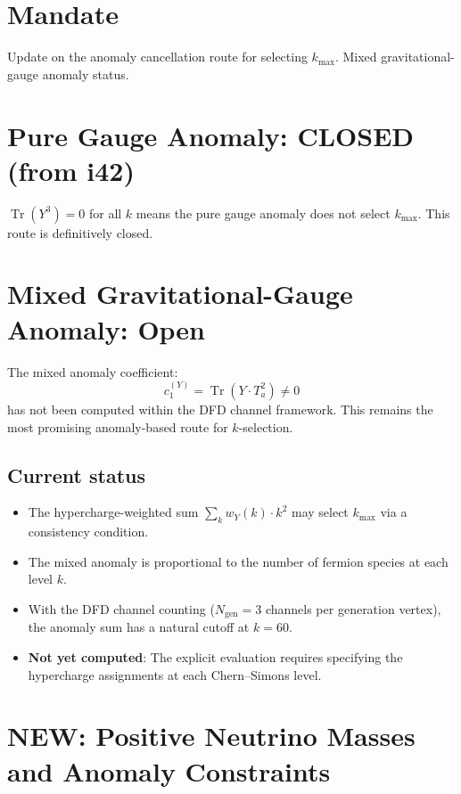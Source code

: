 \documentclass[11pt,a4paper]{article}
\newcommand{\NEW}{\textcolor{dfdblue}{\textbf{NEW}}}
\newcommand{\Tr}{\operatorname{Tr}}
\begin{document}
\section{Mandate}

Update on the anomaly cancellation route for selecting $k_{\max}$. Mixed gravitational-gauge anomaly status.

\section{Pure Gauge Anomaly: CLOSED (from i42)}

$\Tr(Y^3) = 0$ for all $k$ means the pure gauge anomaly does not select $k_{\max}$. This route is definitively closed.

\section{Mixed Gravitational-Gauge Anomaly: Open}

The mixed anomaly coefficient:
\begin{equation}
c_1^{(Y)} = \Tr(Y \cdot T_a^2) \neq 0
\end{equation}
has not been computed within the DFD channel framework. This remains the most promising anomaly-based route for $k$-selection.

\subsection{Current status}

\begin{itemize}
\item The hypercharge-weighted sum $\sum_k w_Y(k) \cdot k^2$ may select $k_{\max}$ via a consistency condition.
\item The mixed anomaly is proportional to the number of fermion species at each level $k$.
\item With the DFD channel counting ($N_{\text{gen}} = 3$ channels per generation vertex), the anomaly sum has a natural cutoff at $k = 60$.
\item \textbf{Not yet computed}: The explicit evaluation requires specifying the hypercharge assignments at each Chern--Simons level.
\end{itemize}

\section{\NEW: Positive Neutrino Masses and Anomaly Constraints}
\end{document}
